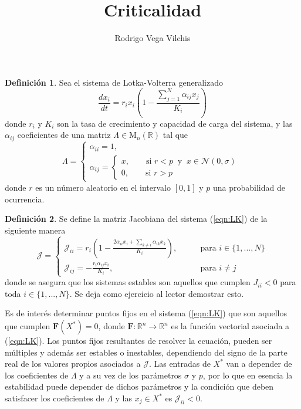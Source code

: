 \documentclass[11pt,a4paper]{article}
\title{\textbf{Criticalidad}}
\author{Rodrigo Vega Vilchis}
\theoremstyle{plain}
\theoremstyle{definition}
\newtheorem{definición}{Definición}
\begin{document}
	\maketitle
	\begin{definición}
		Sea el sistema de Lotka-Volterra generalizado
		\begin{equation}\label{eqn:LK}
			\frac{dx_i}{dt}=r_ix_i\left (1-\frac{\sum_{j=1}^{N}\alpha_{ij}x_j}{K_i}\right )
		\end{equation}
		donde $r_i$ y $K_i$ son la tasa de crecimiento y capacidad de carga del sistema, y las $\alpha_{ij}$ coeficientes de una matriz $\Lambda\in\mathrm{M}_n(\mathbb{R})$ tal que 
		$$\Lambda=
		\begin{cases}
			\alpha_{ii}=1,\\
			\alpha_{ij}=\begin{cases}
				x,\qquad \text{si }r<p\ \text{ y }\ x\in\mathcal{N}(0,\sigma)\\
				0,\qquad \text{si }r>p 
			\end{cases}
		\end{cases}
		$$
		donde $r$ es un número aleatorio en el intervalo $[0,1]$ y $p$ una probabilidad de ocurrencia.
	\end{definición}
	\begin{definición}
		Se define la matriz Jacobiana del sistema (\ref{eqn:LK}) de la siguiente manera
			\begin{equation}\label{eqn:MartizJacobiana}
			\mathcal{J}=\begin{cases}
				\mathcal{J}_{ii} = r_i \left (1-\frac{2\alpha_{ii}x_i+\sum_{k\neq i}\alpha_{ik}x_k}{K_i}\right ),\qquad&\text{para }i\in\{1,...,N\}\\
				\mathcal{J}_{ij} = -\frac{r_i\alpha_{ij}x_i}{K_i},\qquad&\text{para }i\neq j
			\end{cases}
		\end{equation}
		donde se asegura que los sistemas estables son aquellos que cumplen $J_{ii}<0$ para toda $i\in\{1,...,N\}$. Se deja como ejercicio al lector demostrar esto.
	\end{definición}
\setlength{\parindent}{0cm}
Es de interés determinar puntos fijos en el sistema (\ref{eqn:LK}) que son aquellos que cumplen $\textbf{F}(X^*)=0$, donde $\textbf{F}:\mathbb{R}^n\to\mathbb{R}^n$ es la función vectorial asociada a (\ref{eqn:LK}). Los puntos fijos resultantes de resolver la ecuación, pueden ser múltiples y además ser estables o inestables, dependiendo del signo de la parte real de los valores propios asociados a $\mathcal{J}$. Las entradas de $X^*$ van a depender de los coeficientes de $\Lambda$ y a su vez de los parámetros $\sigma$ y $p$, por lo que en esencia la estabilidad puede depender de dichos parámetros y la condición que deben satisfacer los coeficientes de $\Lambda$ y las $x_j\in X^*$ es $\mathcal{J}_{ii}<0$.\\
\end{document}
